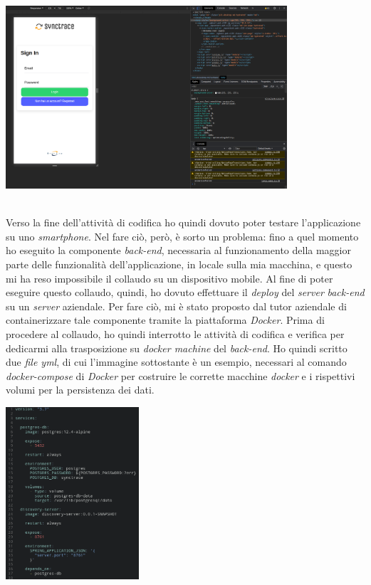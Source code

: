 \begin{minipage}{\linewidth}
  \centering
    \includegraphics[height=6.8cm]{immagini/ionicserve}
\end{minipage} \\


Verso la fine dell'attività di codifica ho quindi dovuto poter testare l'applicazione su uno \textit{smartphone}. Nel fare ciò, però, è sorto un problema: fino a quel momento ho eseguito la componente \textit{back-end}, necessaria al funzionamento della maggior parte delle funzionalità dell'applicazione, in locale sulla mia macchina, e questo mi ha reso impossibile il collaudo su un dispositivo mobile. Al fine di poter eseguire questo collaudo, quindi, ho dovuto effettuare il \textit{deploy} del \textit{server} \textit{back-end} su un \textit{server} aziendale. Per fare ciò, mi è stato proposto dal tutor aziendale di containerizzare tale componente tramite la piattaforma \textit{Docker}. Prima di procedere al collaudo, ho quindi interrotto le attività di codifica e verifica per dedicarmi alla trasposizione su \textit{docker machine} del \textit{back-end}. Ho quindi scritto due \textit{file yml}, di cui l'immagine sottostante è un esempio, necessari al comando \textit{docker-compose} di \textit{Docker} per costruire le corrette macchine \textit{docker} e i rispettivi volumi per la persistenza dei dati. \\

\begin{minipage}{\linewidth}
  \centering
    \includegraphics[height=6.4cm]{immagini/dockeryml}
\end{minipage} \\


